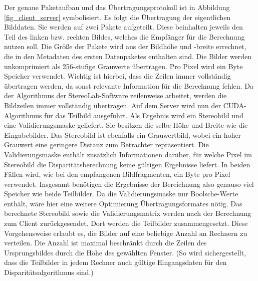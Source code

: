 \documentclass[conference]{IEEEtran}
\begin{document}
Der genaue Paketaufbau und das Übertragungsprotokoll ist in Abbildung \ref{fig_client_server} symbolisiert. Es folgt die Übertragung der eigentlichen Bilddaten. Sie werden auf zwei Pakete aufgeteilt. Diese beinhalten jeweils den Teil des linken bzw. rechten Bildes, welches die Empfänger für die Berechnung nutzen soll. Die Größe der Pakete wird aus der Bildhöhe und -breite errechnet, die in den Metadaten des ersten Datenpaketes enthalten sind. Die Bilder werden unkomprimiert als 256-stufige Grauwerte übertragen. Pro Pixel wird ein Byte Speicher verwendet.
 Wichtig ist hierbei, dass die Zeilen immer vollständig übertragen werden, da sonst relevante Information für die Berechnung fehlen.
Da der Algorithmus der StereoLab-Software zeilenweise arbeitet, werden die Bildzeilen immer vollständig übertragen. %
Auf dem Server wird nun der CUDA-Algorithmus für das Teilbild ausgeführt. Als Ergebnis wird ein Stereobild und eine Validierungsmaske geliefert. Sie besitzen die selbe Höhe und Breite wie die Eingabebilder. Das Stereobild ist ebenfalls ein Grauwertbild, wobei ein hoher Grauwert eine geringere Distanz zum Betrachter repräsentiert. Die Validierungsmaske enthält zusätzlich Informationen darüber, für welche Pixel im Stereobild die Disparitätsberechnung keine gültigen Ergebnisse liefert. In beiden Fällen wird, wie bei den empfangenen Bildfragmenten, ein Byte pro Pixel verwendet. Insgesamt benötigen die Ergebnisse der Bereichnung also genauso viel Speicher wie beide Teilbilder.  Da die Validierungsmaske nur Boolsche-Werte enthält, wäre hier eine weitere Optimierung Übertragungsformates nötig. %
Das berechnete Stereobild sowie die Validierungsmatrix werden nach der Berechnung zum Client zurückgesendet. Dort werden die Teilbilder zusammengesetzt. Diese Vorgehensweise erlaubt es, die Bilder auf eine beliebige Anzahl an Rechnern zu verteilen. Die Anzahl ist maximal beschränkt durch die Zeilen des Ursprungsbildes durch die Höhe des gewählten Fenster. (So wird sichergestellt, dass die Teilbilder in jedem Rechner auch gültige Eingangsdaten für den Disparitätsalgorithmus sind.) %
\end{document}
